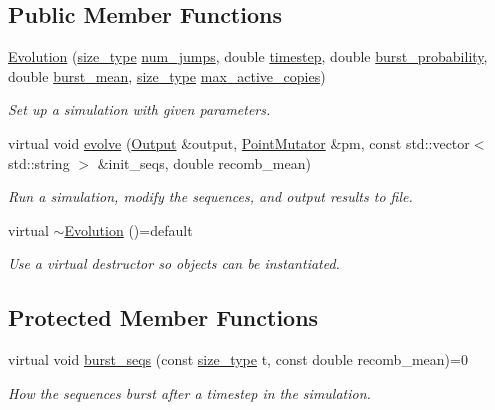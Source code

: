 \subsection*{Public Member Functions}
\begin{DoxyCompactItemize}
\item 
\hyperlink{classretrocombinator_1_1Evolution_a0aa94cf8dd5f6184535faf82842337fd}{Evolution} (\hyperlink{constants_8h_a8e1541b50cee66a791df4c437ccbb385}{size\+\_\+type} \hyperlink{classretrocombinator_1_1Evolution_a043c016f93a961d0e3a2fc9d257b01d9}{num\+\_\+jumps}, double \hyperlink{classretrocombinator_1_1Evolution_afdb375b975d48d9915c6e8337c33a175}{timestep}, double \hyperlink{classretrocombinator_1_1Evolution_afb663b25070c1ca619e682cef2a32196}{burst\+\_\+probability}, double \hyperlink{classretrocombinator_1_1Evolution_ac2f4821269c08b23f21b5333f2067e5f}{burst\+\_\+mean}, \hyperlink{constants_8h_a8e1541b50cee66a791df4c437ccbb385}{size\+\_\+type} \hyperlink{classretrocombinator_1_1Evolution_a0e6b2c75bdc36f8f482162f2f8c67d56}{max\+\_\+active\+\_\+copies})
\begin{DoxyCompactList}\small\item\em Set up a simulation with given parameters. \end{DoxyCompactList}\item 
virtual void \hyperlink{classretrocombinator_1_1Evolution_a0b8a181242ea8ee3072258fa7ed416f4}{evolve} (\hyperlink{classretrocombinator_1_1Output}{Output} \&output, \hyperlink{classretrocombinator_1_1PointMutator}{Point\+Mutator} \&pm, const std\+::vector$<$ std\+::string $>$ \&init\+\_\+seqs, double recomb\+\_\+mean)
\begin{DoxyCompactList}\small\item\em Run a simulation, modify the sequences, and output results to file. \end{DoxyCompactList}\item 
\mbox{\label{classretrocombinator_1_1Evolution_a6162b87324d550c4e4e9315a640a7259}} 
virtual \hyperlink{classretrocombinator_1_1Evolution_a6162b87324d550c4e4e9315a640a7259}{$\sim$\+Evolution} ()=default
\begin{DoxyCompactList}\small\item\em Use a virtual destructor so objects can be instantiated. \end{DoxyCompactList}\end{DoxyCompactItemize}
\subsection*{Protected Member Functions}
\begin{DoxyCompactItemize}
\item 
virtual void \hyperlink{classretrocombinator_1_1Evolution_abab94a3f14460300a6a3b7a0286236a6}{burst\+\_\+seqs} (const \hyperlink{constants_8h_a8e1541b50cee66a791df4c437ccbb385}{size\+\_\+type} t, const double recomb\+\_\+mean)=0
\begin{DoxyCompactList}\small\item\em How the sequences burst after a timestep in the simulation. \end{DoxyCompactList}\end{DoxyCompactItemize}
